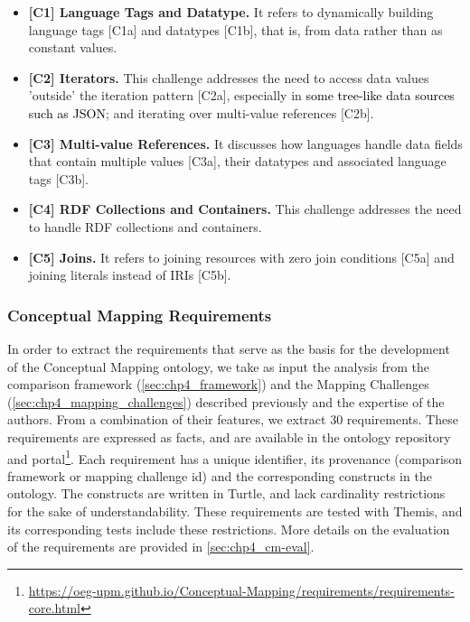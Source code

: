 \begin{itemize}
    \item \textbf{[C1] Language Tags and Datatype.} It refers to dynamically building language tags [C1a] and datatypes [C1b], that is, from data rather than as constant values.
    \item \textbf{[C2] Iterators.} This challenge addresses the need to access data values 'outside' the iteration pattern [C2a], especially in \textcolor{black}{some tree-like data sources such as JSON}; and iterating over multi-value references [C2b].
    \item \textbf{[C3] Multi-value References.} It discusses how languages  handle data fields that contain multiple values [C3a], their datatypes and associated language tags [C3b].
    \item \textbf{[C4] RDF Collections and Containers.} This challenge addresses the need to handle RDF collections and containers.
    \item \textbf{[C5] Joins.} It refers to joining resources with zero join conditions [C5a] and joining literals instead of IRIs [C5b].
\end{itemize} 


\subsubsection{Conceptual Mapping Requirements}
\label{sec:chp4_cm-reqs}

In order to extract the requirements that serve as the basis for the development of the Conceptual Mapping ontology, we take as input the analysis from the comparison framework (\cref{sec:chp4_framework}) and the Mapping Challenges (\cref{sec:chp4_mapping_challenges}) described previously and the expertise of the authors. From a combination of their features, we extract 30 requirements. These requirements are expressed as facts, and are available in the ontology repository and portal\footnote{\url{https://oeg-upm.github.io/Conceptual-Mapping/requirements/requirements-core.html}}. Each requirement has a unique identifier, its provenance (comparison framework or mapping challenge id) and the corresponding constructs in the ontology. The constructs are written in Turtle, and lack cardinality restrictions for the sake of understandability. These requirements are tested with Themis, and its corresponding tests include these restrictions. More details on the evaluation of the requirements are provided in \cref{sec:chp4_cm-eval}. 

